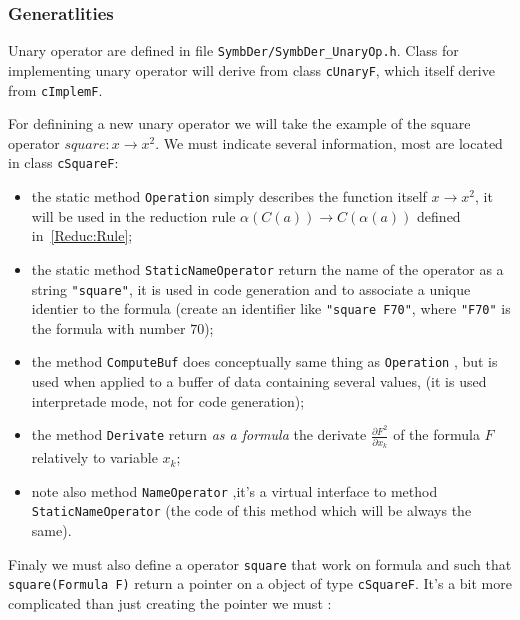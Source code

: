 \subsubsection{Generatlities}

Unary operator are defined in file {\tt SymbDer/SymbDer\_UnaryOp.h}. Class for implementing unary operator
will derive from class  {\tt cUnaryF}, which itself derive from {\tt cImplemF}.


For definining a new unary operator we will take the example of the square operator   $square : x \rightarrow x^2$.
We must indicate several information, most are located in class {\tt cSquareF}:

\begin{itemize}
	\item   the static method {\tt Operation} simply describes the function itself $x \rightarrow x^2$, it will be  used
		in the reduction rule $ \alpha (C(a)) \rightarrow C(\alpha (a)) $ defined in~\ref{Reduc:Rule};
	
	\item  the static method {\tt StaticNameOperator} return the name of the  operator as a string {\tt "square"}, 
		it is used in code generation and to associate a unique identier to the formula (create an
		identifier like {\tt "square F70"}, where  {\tt "F70"} is the formula with number $70$);

	\item  the method {\tt ComputeBuf} does conceptually same thing as {\tt Operation} , but is used when
		applied to a buffer of data containing several values, (it is used interpretade mode, 
		not for code generation);

	\item  the method {\tt  Derivate}  return \emph{as a formula} the derivate $\frac{\partial F^2}{\partial x_k}$
		of the formula $F$ relatively to variable $x_k$;

        \item note also method {\tt NameOperator} ,it's  a virtual interface to method {\tt StaticNameOperator}
		(the code of this method which will be always the same).
\end{itemize}

Finaly we must also define a operator {\tt square} that work on formula and such that {\tt square(Formula F)} 
return a pointer on a object of type {\tt cSquareF}.  It's a bit more complicated than just creating
the pointer we must :

